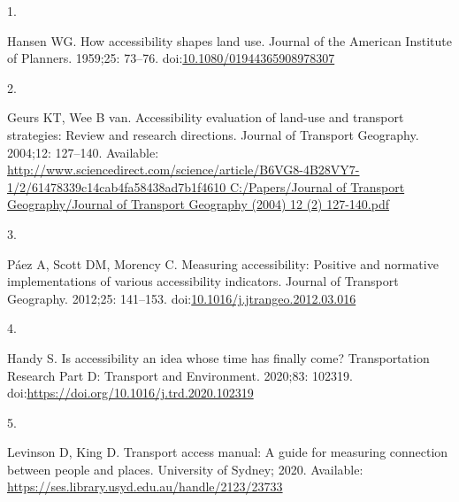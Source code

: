 \documentclass[10pt,letterpaper]{article}
\newlength{\cslhangindent}
\newlength{\csllabelwidth}
\newlength{\cslentryspacingunit} %
\newenvironment{CSLReferences}[2] %
 {%
  \setlength{\parindent}{0pt}
  \ifodd #1
  \let\oldpar\par
  \def\par{\hangindent=\cslhangindent\oldpar}
  \fi
  \setlength{\parskip}{#2\cslentryspacingunit}
 }%
 {}
\newcommand{\CSLLeftMargin}[1]{\parbox[t]{\csllabelwidth}{#1}}
\newcommand{\CSLRightInline}[1]{\parbox[t]{\linewidth - \csllabelwidth}{#1}\break}
\providecommand{\DIFaddbegin}{} %
\providecommand{\DIFaddend}{} %
\providecommand{\DIFdelbegin}{} %
\providecommand{\DIFdelend}{} %
\newcommand{\DIFscaledelfig}{0.5}
\newlength{\DIFdelgraphicswidth} %
\newlength{\DIFdelgraphicsheight} %
\newcommand{\DIFaddincludegraphics}[2][]{{\color{blue}\fbox{\DIFOincludegraphics[#1]{#2}}}} %
\newcommand{\DIFdelincludegraphics}[2][]{%
\sbox{\DIFdelgraphicsbox}{\DIFOincludegraphics[#1]{#2}}%
\settoboxwidth{\DIFdelgraphicswidth}{\DIFdelgraphicsbox} %
\settoboxtotalheight{\DIFdelgraphicsheight}{\DIFdelgraphicsbox} %
\scalebox{\DIFscaledelfig}{%
\parbox[b]{\DIFdelgraphicswidth}{\usebox{\DIFdelgraphicsbox}\\[-\baselineskip] \rule{\DIFdelgraphicswidth}{0em}}\llap{\resizebox{\DIFdelgraphicswidth}{\DIFdelgraphicsheight}{%
\setlength{\unitlength}{\DIFdelgraphicswidth}%
\begin{picture}(1,1)%
\thicklines\linethickness{2pt} %
{\color[rgb]{1,0,0}\put(0,0){\framebox(1,1){}}}%
{\color[rgb]{1,0,0}\put(0,0){\line( 1,1){1}}}%
{\color[rgb]{1,0,0}\put(0,1){\line(1,-1){1}}}%
\end{picture}%
}\hspace*{3pt}}} %
} %
\DeclareRobustCommand{\DIFaddbegin}{\DIFOaddbegin \let\includegraphics\DIFaddincludegraphics} %
\DeclareRobustCommand{\DIFaddend}{\DIFOaddend \let\includegraphics\DIFOincludegraphics} %
\DeclareRobustCommand{\DIFdelbegin}{\DIFOdelbegin \let\includegraphics\DIFdelincludegraphics} %
\DeclareRobustCommand{\DIFdelend}{\DIFOaddend \let\includegraphics\DIFOincludegraphics} %
\begin{document}
\hypertarget{refs}{}
\begin{CSLReferences}{0}{0}
\leavevmode{}%
\CSLLeftMargin{1. }%
\CSLRightInline{Hansen WG. How accessibility shapes land use. Journal of
the American Institute of Planners. 1959;25: 73--76.
doi:\href{https://doi.org/10.1080/01944365908978307}{10.1080/01944365908978307}}

\leavevmode{}%
\CSLLeftMargin{2. }%
\CSLRightInline{Geurs KT, Wee B van. Accessibility evaluation of
land-use and transport strategies: Review and research directions.
Journal of Transport Geography. 2004;12: 127--140. Available:
\href{http://www.sciencedirect.com/science/article/B6VG8-4B28VY7-1/2/61478339c14cab4fa58438ad7b1f4610\%0AC:/Papers/Journal\%20of\%20Transport\%20Geography/Journal\%20of\%20Transport\%20Geography\%20(2004)\%2012\%20(2)\%20127-140.pdf}{http://www.sciencedirect.com/science/article/B6VG8-4B28VY7-1/2/61478339c14cab4fa58438ad7b1f4610
C:/Papers/Journal of Transport Geography/Journal of Transport Geography
(2004) 12 (2) 127-140.pdf}}

\leavevmode{}%
\CSLLeftMargin{3. }%
\DIFdelbegin %
\DIFdelend \DIFaddbegin \CSLRightInline{Páez A, Scott DM, Morency C. Measuring accessibility:
Positive and normative implementations of various accessibility
indicators. Journal of Transport Geography. 2012;25: 141--153.
doi:\href{https://doi.org/10.1016/j.jtrangeo.2012.03.016}{10.1016/j.jtrangeo.2012.03.016}}
\DIFaddend 

\leavevmode{}%
\CSLLeftMargin{4. }%
\CSLRightInline{Handy S. Is accessibility an idea whose time has finally
come? Transportation Research Part D: Transport and Environment.
2020;83: 102319. doi:\url{https://doi.org/10.1016/j.trd.2020.102319}}

\leavevmode{}%
\CSLLeftMargin{5. }%
\CSLRightInline{Levinson D, King D. Transport access manual: {A} guide
for measuring connection between people and places. {University of
Sydney}; 2020. Available:
\url{https://ses.library.usyd.edu.au/handle/2123/23733}}


\end{CSLReferences}
\end{document}
